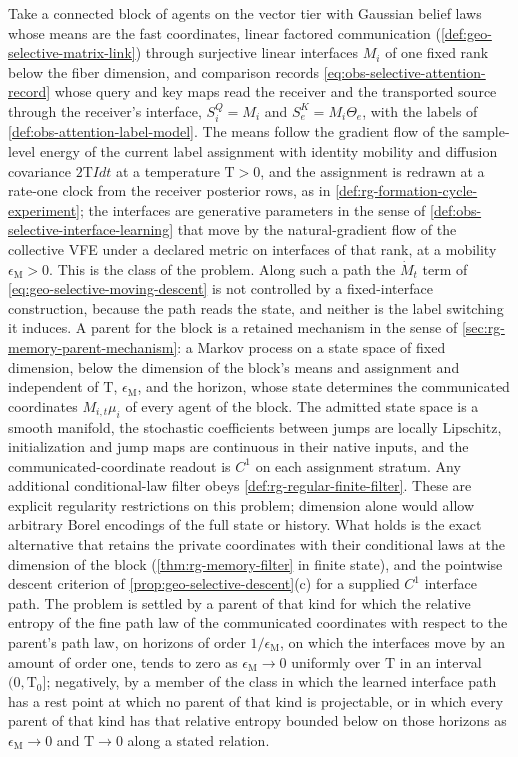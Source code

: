 Take a connected block of agents on the vector tier with Gaussian belief laws
whose means are the fast coordinates, linear factored communication
(\cref{def:geo-selective-matrix-link}) through surjective linear interfaces
\(M_i\) of one fixed rank below the fiber dimension, and comparison records
\eqref{eq:obs-selective-attention-record} whose query and key maps read the
receiver and the transported source through the receiver's interface,
\(S^Q_i=M_i\) and \(S^K_e=M_i\Theta_e\), with the labels of
\cref{def:obs-attention-label-model}. The means follow the gradient flow of
the sample-level energy of the current label assignment with identity
mobility and diffusion covariance \(2\mathrm TI dt\) at a temperature
\(\mathrm T>0\), and the assignment is redrawn at a rate-one clock from the
receiver posterior rows, as in \cref{def:rg-formation-cycle-experiment}; the
interfaces are generative parameters in the sense of
\cref{def:obs-selective-interface-learning} that move by the natural-gradient
flow of the collective VFE under a declared metric on interfaces of that
rank, at a mobility \(\epsilon_{\mathrm M}>0\). This is the class of the
problem. Along such a path the \(\dot M_t\) term of
\eqref{eq:geo-selective-moving-descent} is not controlled by a fixed-interface
construction, because the path reads the state, and neither is the label
switching it induces. A parent for the block is a retained mechanism in the
sense of \cref{sec:rg-memory-parent-mechanism}: a Markov process on a state
space of fixed dimension, below the dimension of the block's means and
assignment and independent of \(\mathrm T\), \(\epsilon_{\mathrm M}\), and
the horizon, whose state determines the communicated coordinates
\(M_{i,t}\mu_i\) of every agent of the block. The admitted state space is a
smooth manifold, the stochastic coefficients between jumps are locally
Lipschitz, initialization and jump maps are continuous in their native inputs,
and the communicated-coordinate readout is \(C^1\) on each assignment
stratum. Any additional conditional-law filter obeys
\cref{def:rg-regular-finite-filter}. These are explicit regularity restrictions
on this problem; dimension alone would allow arbitrary Borel encodings of
the full state or history. What holds is the exact
alternative that retains the private coordinates with their conditional laws
at the dimension of the block (\cref{thm:rg-memory-filter} in finite state),
and the pointwise descent criterion of \cref{prop:geo-selective-descent}(c)
for a supplied \(C^1\) interface path. The problem is settled by a parent of
that kind for which the relative entropy of the fine path law of the
communicated coordinates with respect to the parent's path law, on horizons
of order \(1/\epsilon_{\mathrm M}\), on which the interfaces move by an
amount of order one, tends to zero as \(\epsilon_{\mathrm M}\to0\) uniformly
over \(\mathrm T\) in an interval \((0,\mathrm T_0]\); negatively, by a member
of the class in which the learned interface path has a rest point at which no
parent of that kind is projectable, or in which every parent of that kind has
that relative entropy bounded below on those horizons as
\(\epsilon_{\mathrm M}\to0\) and \(\mathrm T\to0\) along a stated relation.


